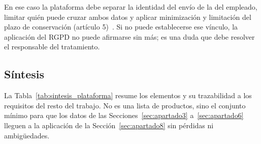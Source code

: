 \documentclass[11pt,a4paper]{article}
\begin{document}
En ese caso la plataforma debe separar la identidad del envío de la del empleado, limitar quién puede cruzar ambos datos y aplicar minimización y limitación del plazo de conservación (artículo 5)~\cite{ref45}. Si no puede establecerse ese vínculo, la aplicación del RGPD no puede afirmarse sin más; es una duda que debe resolver el responsable del tratamiento.

\subsection{Síntesis}
\label{sec:apartado7_7}

La Tabla~\ref{tab:sintesis_plataforma} resume los elementos y su trazabilidad a los requisitos del resto del trabajo. No es una lista de productos, sino el conjunto mínimo para que los datos de las Secciones~\ref{sec:apartado3} a~\ref{sec:apartado6} lleguen a la aplicación de la Sección~\ref{sec:apartado8} sin pérdidas ni ambigüedades.
\end{document}
